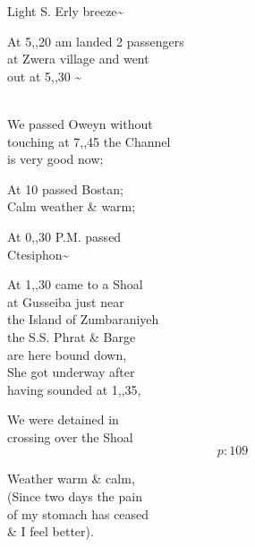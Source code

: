 \documentclass{report}
\begin{document}
	\par{
 	Light S. Erly breeze\~{}\ \\
	}

	\par{
 	At 5,,20 am landed 2 passengers\ \\at Zwera village and went\ \\out at 5,,30 \~{}\ \\\ \\
	}

	\par{
 	We passed Oweyn without\ \\touching at 7,,45 the Channel\ \\is very good now;\ \\
	}

	\par{
 	At 10 passed Bostan;\ \\Calm weather \& warm;\ \\
	}

	\par{
 	At 0,,30 P.M. passed\ \\Ctesiphon\~{}\ \\
	}

	\par{
 	At 1,,30 came to a Shoal\ \\at Gusseiba just near\ \\the Island of Zumbaraniyeh\ \\the S.S. Phrat \& Barge\ \\are here bound down,\ \\She got underway after\ \\having sounded at 1,,35,\ \\
	}

	\par{
 	We were detained in\ \\crossing over the Shoal\ \\
  \[p: 109 \]

	}




	\par{
 	Weather warm \& calm,\ \\(Since two days the pain\ \\of my stomach has ceased\ \\\& I feel better).\ \\
	}
\end{document}
